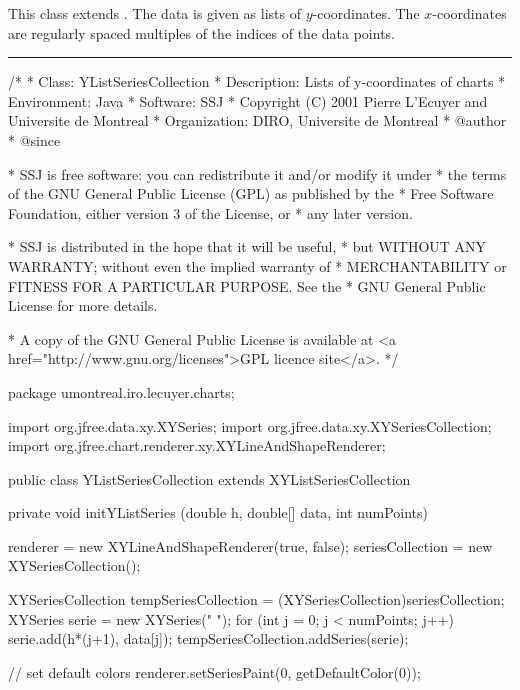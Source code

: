 
This class extends
.
The data is given as lists of $y$-coordinates. The $x$-coordinates are
regularly spaced multiples of the indices of the data points.

\bigskip\hrule
\begin{code}
\begin{hide}
/*
 * Class:        YListSeriesCollection
 * Description:  Lists of y-coordinates of charts
 * Environment:  Java
 * Software:     SSJ 
 * Copyright (C) 2001  Pierre L'Ecuyer and Universite de Montreal
 * Organization: DIRO, Universite de Montreal
 * @author       
 * @since

 * SSJ is free software: you can redistribute it and/or modify it under
 * the terms of the GNU General Public License (GPL) as published by the
 * Free Software Foundation, either version 3 of the License, or
 * any later version.

 * SSJ is distributed in the hope that it will be useful,
 * but WITHOUT ANY WARRANTY; without even the implied warranty of
 * MERCHANTABILITY or FITNESS FOR A PARTICULAR PURPOSE.  See the
 * GNU General Public License for more details.

 * A copy of the GNU General Public License is available at
   <a href="http://www.gnu.org/licenses">GPL licence site</a>.
 */
\end{hide}
package umontreal.iro.lecuyer.charts;\begin{hide}

import   org.jfree.data.xy.XYSeries;
import   org.jfree.data.xy.XYSeriesCollection;
import   org.jfree.chart.renderer.xy.XYLineAndShapeRenderer;
\end{hide}

public class YListSeriesCollection extends XYListSeriesCollection \begin{hide} {

   private void initYListSeries (double h, double[] data, int numPoints)
   {
      renderer = new XYLineAndShapeRenderer(true, false);
      seriesCollection = new XYSeriesCollection();

      XYSeriesCollection tempSeriesCollection =
         (XYSeriesCollection)seriesCollection;
      XYSeries serie = new XYSeries(" ");
      for (int j = 0; j < numPoints; j++)
         serie.add(h*(j+1), data[j]);
      tempSeriesCollection.addSeries(serie);

      // set default colors
      renderer.setSeriesPaint(0, getDefaultColor(0));

}}
\end{hide}
\end{code}
